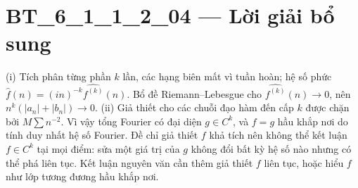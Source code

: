 \documentclass[10pt,a4paper]{article}
\begin{document}
\section*{BT\_6\_1\_1\_2\_04 — Lời giải bổ sung}
(i) Tích phân từng phần $k$ lần, các hạng biên mất vì tuần hoàn; hệ số phức $\widehat f(n)=(in)^{-k}\widehat{f^{(k)}}(n)$. Bổ đề Riemann--Lebesgue cho $\widehat{f^{(k)}}(n)\to0$, nên $n^k(|a_n|+|b_n|)\to0$.
(ii) Giả thiết cho các chuỗi đạo hàm đến cấp $k$ được chặn bởi $M\sum n^{-2}$. Vì vậy tổng Fourier có đại diện $g\in C^k$, và $f=g$ hầu khắp nơi do tính duy nhất hệ số Fourier. Đề chỉ giả thiết $f$ khả tích nên không thể kết luận $f\in C^k$ tại mọi điểm: sửa một giá trị của $g$ không đổi bất kỳ hệ số nào nhưng có thể phá liên tục. Kết luận nguyên văn cần thêm giả thiết $f$ liên tục, hoặc hiểu $f$ như lớp tương đương hầu khắp nơi.
\end{document}
